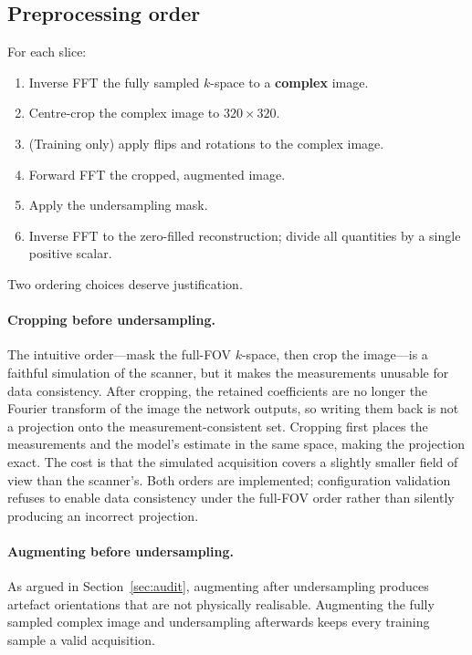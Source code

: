 \documentclass[11pt]{article}
\begin{document}
\subsection{Preprocessing order}

For each slice:
\begin{enumerate}
  \item Inverse FFT the fully sampled $k$-space to a \textbf{complex} image.
  \item Centre-crop the complex image to $320\times320$.
  \item (Training only) apply flips and rotations to the complex image.
  \item Forward FFT the cropped, augmented image.
  \item Apply the undersampling mask.
  \item Inverse FFT to the zero-filled reconstruction; divide all quantities by
        a single positive scalar.
\end{enumerate}

Two ordering choices deserve justification.

\paragraph{Cropping before undersampling.} The intuitive order---mask the
full-FOV $k$-space, then crop the image---is a faithful simulation of the
scanner, but it makes the measurements unusable for data consistency. After
cropping, the retained coefficients are no longer the Fourier transform of the
image the network outputs, so writing them back is not a projection onto the
measurement-consistent set. Cropping first places the measurements and the
model's estimate in the same space, making the projection exact. The cost is
that the simulated acquisition covers a slightly smaller field of view than the
scanner's. Both orders are implemented; configuration validation refuses to
enable data consistency under the full-FOV order rather than silently producing
an incorrect projection.

\paragraph{Augmenting before undersampling.} As argued in
Section~\ref{sec:audit}, augmenting after undersampling produces artefact
orientations that are not physically realisable. Augmenting the fully sampled
complex image and undersampling afterwards keeps every training sample a valid
acquisition.
\end{document}
